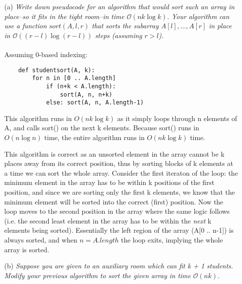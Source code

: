 \documentclass[11pt]{article} \setlength{\oddsidemargin}{0in}
\begin{document}
{

  \begin{enumerate}
  \item[(a)]{\textit{Write down pseudocode for an algorithm that would
        sort such an array in place--so it fits in the tight room--in time
        $\mathcal{O}(n k \log k)$. Your algorithm can use a function
        $sort(A, l, r)$ that sorts the subarray $A[l],\dots,A[r]$ in
        place in $\mathcal{O}((r-l) \log(r-l))$ steps (assuming $r > l$).}}
    \\\\
    Assuming 0-based indexing:
    \begin{verbatim}
    def studentsort(A, k):
        for n in [0 .. A.length]
            if (n+k < A.length):
                sort(A, n, n+k)
            else: sort(A, n, A.length-1)
    \end{verbatim}

    This algorithm runs in $O(nk\log k)$ as it simply loops through n elements of A, and calls sort() on the next k elements. Because sort() runs in $O(n \log n)$ time, the entire algorithm runs in $O(n k \log k)$ time. 

    This algorithm is correct as an unsorted element in the array cannot be k places away from its correct position, thus by sorting blocks of k elements at a time we can sort the whole array. Consider the first iteraton of the loop: the minimum element in the array has to be within k positions of the first position, and since we are sorting only the first k elements, we know that the minimum element will be sorted into the correct (first) position. Now the loop moves to the second position in the array where the same logic follows (i.e. the second least element in the array has to be within the \textit{next} k elements being sorted). Essentially the left region of the array (A[0 .. n-1]) is always sorted, and when $n=A.length$ the loop exits, implying the whole array is sorted.

  \item[(b)]{\textit{Suppose you are given to an auxiliary room which
        can fit k + 1 students. Modify your previous algorithm to sort
        the given array in time $\mathcal{O}(nk)$.}}
    \\\\


\end{enumerate}}
\end{document}
